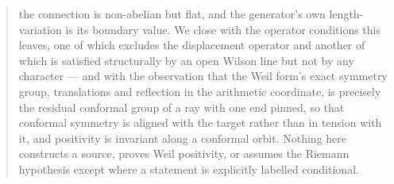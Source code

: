 \documentclass[11pt]{article}
\numberwithin{equation}{section}
\theoremstyle{definition}
\theoremstyle{remark}
\begin{document}
\begin{abstract}
the connection is non-abelian but flat, and the generator's own length-variation
is its boundary value. We close with the operator conditions this leaves, one of
which excludes the displacement operator and another of which is satisfied
structurally by an open Wilson line but not by any character --- and with the
observation that the Weil form's exact symmetry group, translations and
reflection in the arithmetic coordinate, is precisely the residual conformal
group of a ray with one end pinned, so that conformal symmetry is aligned with
the target rather than in tension with it, and positivity is invariant along a
conformal orbit. Nothing here
constructs a source, proves Weil positivity, or assumes the Riemann hypothesis
except where a statement is explicitly labelled conditional.
\end{abstract}

\clearpage
{\small\tableofcontents}
\clearpage









\appendix

\clearpage
{}
{}

\end{document}
